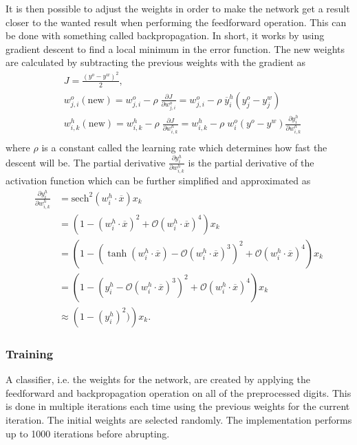 \documentclass[report.tex]{subfile}
\begin{document}
It is then possible to adjust the weights in order to make the network get a
result closer to the wanted result when performing the feedforward operation.
This can be done with something called backpropagation. In short, it works by
using gradient descent to find a local minimum in the error function. The new
weights are calculated by subtracting the previous weights with the gradient as
\begin{align*}
    &J = \frac{(y^o - y^w)^2}{2}, \\
    &w^o_{j,i}(\textrm{new}) = w^o_{j,i} - \rho \; \frac{\partial J}{\partial w^o_{j,i}}
               = w^o_{j,i} - \rho \; \overline y^h_i (y^o_j - y^w_j)\\
    &w^h_{i,k}(\textrm{new}) = w^h_{i,k} - \rho \; \frac{\partial J}{\partial w^h_{i,k}}
               = w^h_{i,k} - \rho \; w^o_i(y^o - y^w)
                             \frac{\partial y^h_i}{\partial w^h_{i,k}}\\
\end{align*}
where $\rho$ is a constant called the learning rate which determines how fast
the descent will be. The partial derivative $\frac{\partial y^h_i}{\partial
w^h_{i,k}}$ is the partial derivative of the activation function which can be
further simplified and approximated as
\begin{align*}
    \frac{\partial y^h_i}{\partial w^h_{i,k}}
        &= \textrm{sech}^2\left( w^h_i \cdot \overline x \right) x_k \\
        &= \left(1-\left( w^h_i \cdot \overline x \right)^2
            + \mathcal{O}\left( w^h_i \cdot \overline x \right)^4
           \right) x_k\\
        &= \left(1-\left(\tanh\left( w^h_i \cdot \overline x\right)
            - \mathcal{O}\left(w^h_i \cdot \overline x \right)^3 \right)^2
                + \mathcal{O}\left( w^h_i \cdot \overline x \right)^4
           \right) x_k\\
        &= \left(1-\left(
                    y^h_i - \mathcal{O}\left(w^h_i \cdot \overline x \right)^3
                   \right)^2
                + \mathcal{O}\left( w^h_i \cdot \overline x \right)^4
           \right) x_k\\
        &\approx \left(1-(y^h_i)^2)\right) x_k.
\end{align*}

\subsubsection{Training}
A classifier, i.e. the weights for the network, are created by applying the
feedforward and backpropagation operation on all of the preprocessed digits.
This is done in multiple iterations each time using the previous weights for
the current iteration. The initial weights are selected randomly. The
implementation performs up to 1000 iterations before abrupting.
\end{document}
